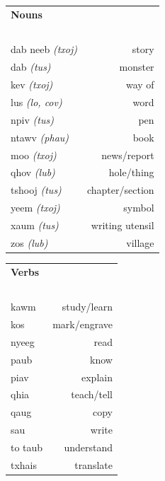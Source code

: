 \documentclass{article}
\begin{document}
\begin{multicols}{2}
[
\section*{}
\begin{center}\rule{\textwidth}{.4pt}\end{center}
]

\begin{tabular}{l r}
\textbf{Nouns} \\
~\\
dab neeb {\em (txoj)} &story\\
dab {\em (tus)} &monster\\
kev {\em (txoj)} &way of\\
lus {\em (lo, cov)} &word\\
npiv {\em (tus)} &pen\\
ntawv {\em (phau)} &book\\
moo {\em (txoj)} &news/report\\
qhov {\em (lub)} &hole/thing\\
tshooj {\em (tus)} &chapter/section\\
yeem {\em (txoj)} &symbol\\
xaum {\em (tus)} &writing utensil\\
zos {\em (lub)} &village\\
\end{tabular}

\begin{tabular}{l r}
\textbf{Verbs} \\
~\\
kawm &study/learn\\
kos &mark/engrave\\
nyeeg &read\\
paub &know\\
piav &explain\\
qhia &teach/tell\\
qaug &copy\\
sau &write\\
to taub &understand\\
txhais &translate\\
\end{tabular}
\end{multicols}

\clearpage
\end{document}
